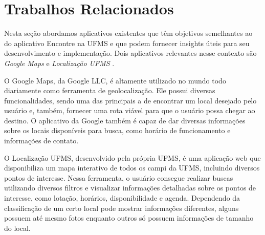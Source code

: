 \section{Trabalhos Relacionados}
\label{sec:trabalhos_relacionados}

Nesta seção abordamos aplicativos existentes que têm objetivos semelhantes ao do aplicativo Encontre na UFMS e que podem fornecer insights úteis para seu desenvolvimento e implementação. Dois aplicativos relevantes nesse contexto são \textit{Google Maps} \cite{maps2005} e \textit{Localização UFMS} \cite{localizacaoufms}.

O Google Maps, da Google LLC, é altamente utilizado no mundo todo diariamente como ferramenta de geolocalização. Ele possui diversas funcionalidades, sendo uma das principais a de encontrar um local desejado pelo usuário e, também, fornecer uma rota viável para que o usuário possa chegar ao destino. O aplicativo da Google também é capaz de dar diversas informações sobre os locais disponíveis para busca, como horário de funcionamento e informações de contato.

O Localização UFMS, desenvolvido pela própria UFMS, é uma aplicação web que disponibiliza um mapa interativo de todos os campi da UFMS, incluindo diversos pontos de interesse. Nessa ferramenta, o usuário consegue realizar buscas utilizando diversos filtros e visualizar informações detalhadas sobre os pontos de interesse, como lotação, horários, disponibilidade e agenda. Dependendo da classificação de um certo local pode mostrar informações diferentes, alguns possuem até mesmo fotos enquanto outros só possuem informações de tamanho do local. 